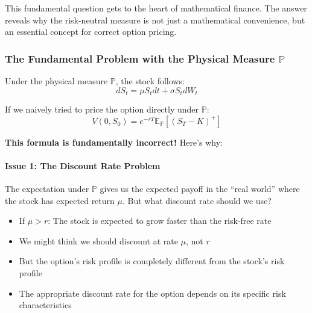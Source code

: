 \documentclass[
  letterpaper,
  DIV=11,
  numbers=noendperiod]{scrartcl}
\let\oldparagraph\paragraph
\renewcommand{\paragraph}[1]{\oldparagraph{#1}\mbox{}}
\providecommand{\tightlist}{%
  \setlength{\itemsep}{0pt}\setlength{\parskip}{0pt}}\usepackage{longtable,booktabs,array}
\begin{document}
\begin{tcolorbox}[enhanced jigsaw, colback=white, rightrule=.15mm, coltitle=black, left=2mm, colframe=quarto-callout-note-color-frame, breakable, arc=.35mm, bottomtitle=1mm, toptitle=1mm, titlerule=0mm, leftrule=.75mm, colbacktitle=quarto-callout-note-color!10!white, title=\textcolor{quarto-callout-note-color}{\faInfo}\hspace{0.5em}{Why Do We Need the Risk-Neutral Measure \(\mathbb{Q}\) at All?}, toprule=.15mm, opacitybacktitle=0.6, bottomrule=.15mm, opacityback=0]

This fundamental question gets to the heart of mathematical finance. The
answer reveals why the risk-neutral measure is not just a mathematical
convenience, but an essential concept for correct option pricing.

\hypertarget{the-fundamental-problem-with-the-physical-measure-mathbbp}{%
\subsubsection{\texorpdfstring{The Fundamental Problem with the Physical
Measure
\(\mathbb{P}\)}{The Fundamental Problem with the Physical Measure \textbackslash mathbb\{P\}}}\label{the-fundamental-problem-with-the-physical-measure-mathbbp}}

Under the physical measure \(\mathbb{P}\), the stock follows:
\[dS_t = \mu S_t dt + \sigma S_t dW_t\]

If we naively tried to price the option directly under \(\mathbb{P}\):
\[V(0, S_0) = e^{-rT} \mathbb{E}_\mathbb{P}[(S_T - K)^+]\]

\textbf{This formula is fundamentally incorrect!} Here's why:

\hypertarget{issue-1-the-discount-rate-problem}{%
\paragraph{Issue 1: The Discount Rate
Problem}\label{issue-1-the-discount-rate-problem}}

The expectation under \(\mathbb{P}\) gives us the expected payoff in the
``real world'' where the stock has expected return \(\mu\). But what
discount rate should we use?

\begin{itemize}
\tightlist
\item
  If \(\mu > r\): The stock is expected to grow faster than the
  risk-free rate
\item
  We might think we should discount at rate \(\mu\), not \(r\)
\item
  But the option's risk profile is completely different from the stock's
  risk profile
\item
  The appropriate discount rate for the option depends on its specific
  risk characteristics
\end{itemize}


\end{tcolorbox}
\end{document}
